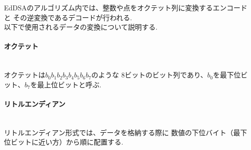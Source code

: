 EdDSAのアルゴリズム内では、整数や点をオクテット列に変換するエンコードと
その逆変換であるデコードが行われる.\\
以下で使用されるデータの変換について説明する.\\[0.5em]

\paragraph{オクテット}\leavevmode\\
オクテットは\textbf{$b_0b_1b_2b_3b_4b_5b_6b_7$}のような
8ビットのビット列であり、$b_0$を最下位ビット、$b_7$を最上位ビットと呼ぶ.\\[1em]
\vspace{1em}
\paragraph{リトルエンディアン}\leavevmode\\
リトルエンディアン形式では、データを格納する際に
数値の下位バイト（最下位ビットに近い方）から順に配置する.\\[1em]
\vspace{1em}
